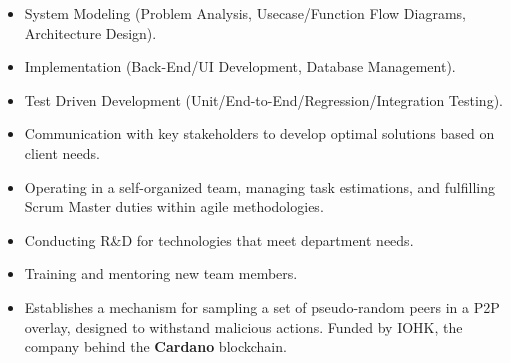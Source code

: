 \documentclass[10pt,a4paper,ragged2e,withhyper]{altacv}
\begin{document}
\begin{paracol}{2}
            \begin{itemize}
                \item System Modeling (Problem Analysis, Usecase/Function Flow Diagrams, Architecture Design).
                \item Implementation (Back-End/UI Development, Database Management).
                \item Test Driven Development (Unit/End-to-End/Regression/Integration Testing).
                \item Communication with key stakeholders to develop optimal solutions based on client needs.
                \item Operating in a self-organized team, managing task estimations, and fulfilling Scrum Master duties within agile methodologies.
                \item Conducting R\&D for technologies that meet department needs.
                \item Training and mentoring new team members.
            \end{itemize}
            
        




        \hfill

            \begin{itemize}
                \item[] Establishes a mechanism for sampling a set of pseudo-random peers in a P2P overlay, designed to withstand malicious actions. Funded by IOHK, the company behind the \textbf{Cardano} blockchain.
            \end{itemize}
            \divider
        

\end{paracol}
\end{document}
